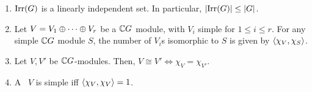 \begin{proposition} \label{Ch2:Prop:Bhv_Irred_Char}
    \hfill
    \begin{enumerate}[label = \normalfont \arabic*., noitemsep]
        \item $\operatorname{Irr}\!\left( G \right)$ is a linearly independent set. In particular, $\left\lvert \operatorname{Irr}\!\left( G \right) \right\rvert \leq \left\lvert G \right\rvert$.
        
        \item Let $V = V_1 \oplus \cdots \oplus V_r$ be a $\mathbb{C} G$ module, with $V_i$ simple for $1 \leq i \leq r$. For any simple $\mathbb{C} G$ module $S$, the number of $V_i$s isomorphic to $S$ is given by $\left\langle \chi_V, \chi_S \right\rangle$.
        
        \item Let $V, V'$ be $\mathbb{C} G$-modules. Then, $V \cong V' \iff \chi_V = \chi_{V'}$.
        
        \item A \CGM\ $V$ is simple iff $\left\langle \chi_V, \chi_V \right\rangle = 1$.
    \end{enumerate}
\end{proposition}
